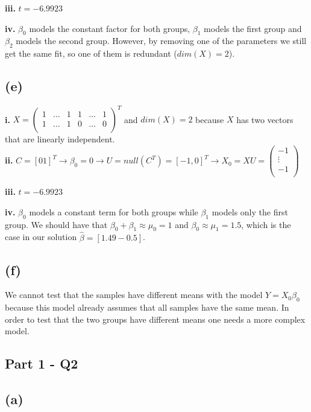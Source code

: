\documentclass[12pt,a4paper,oneside]{report}
\begin{document}
\textbf{iii. } $t = -6.9923$

\textbf{iv. } $\beta_0$ models the constant factor for both groups, $\beta_1$ models the first group and $\beta_2$ models the second group. However, by removing one of the parameters we still get the same fit, so one of them is redundant ($dim(X) = 2$).

\subsection*{(e)}

\textbf{i. } $X = \begin{pmatrix}
1 & \dots & 1 & 1 & \dots & 1\\
1 & \dots & 1 & 0 & \dots & 0\\
\end{pmatrix}^T$ and $dim(X) = 2$ because $X$ has two vectors that are linearly independent.\\

\textbf{ii. } $C = [0 1]^T \to \beta_0 = 0 \to U = null(C^T) = [-1, 0]^T \to X_0 = X U = \begin{pmatrix}
-1\\
\vdots\\
-1\\
\end{pmatrix}$

\textbf{iii. } $t = -6.9923$

\textbf{iv. } $\beta_0$ models a constant term for both groups while $\beta_1$ models only the first group. We should have that $\beta_0 + \beta_1 \approx \mu_0 = 1$ and $\beta_0 \approx \mu_1 = 1.5$, which is the case in our solution $\hat{\beta} = [1.49 -0.5]$.

\subsection*{(f)}

We cannot test that the samples have different means with the model $Y=X_0\beta_0$ because this model already assumes that all samples have the same mean. In order to test that the two groups have different means one needs a more complex model.

\subsection*{Part 1 - Q2}

\subsection*{(a)}
\end{document}
